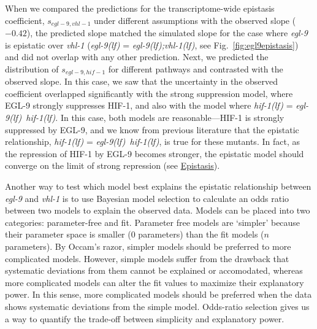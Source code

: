 \documentclass[10pt, onecolumn]{article}
\newcommand{\gene}[1]{\emph{#1}}
\newcommand{\egl}{\emph{\mbox{egl-9}(lf)}}
\newcommand{\eglvhl}{\emph{\mbox{egl-9(lf);vhl-1(lf)}}}
\newcommand{\eglhif}{\emph{\mbox{egl-9(lf)}~\mbox{hif-1(lf)}}}
\newcommand{\hif}{\emph{\mbox{hif-1(lf)}}}
\newcommand{\eglp}{EGL-9}
\newcommand{\hifp}{HIF-1}
\begin{document}
When we compared the predictions for the transcriptome-wide epistasis coefficient,
$s_{egl-9,vhl-1}$ under different assumptions with the observed slope ($-0.42$),
the predicted slope matched the simulated slope for the case where
\gene{egl-9} is epistatic over \gene{vhl-1} (\egl{} = \eglvhl{}, see
Fig.~\ref{fig:egl9epistasis}) and did not overlap with any other prediction.
Next, we predicted the distribution of $s_{egl-9,hif-1}$ for different pathways
and contrasted with the observed slope. In this case, we saw that the uncertainty
in the observed coefficient overlapped significantly with the strong suppression
model, where \eglp{} strongly suppresses \hifp{}, and also with the model where
\hif{} = \eglhif{}. In this case, both models are reasonable---\hifp{} is strongly
suppressed by \eglp{}, and we know from previous literature that the epistatic
relationship, \hif{} = \eglhif{}, is true for these mutants. In fact, as the
repression of \hifp{} by \eglp{} becomes stronger, the epistatic model should
converge on the limit of strong repression (see
\href{https://wormlabcaltech.github.io/mprsq/analysis_notebooks/epistasis_6.html}
{Epistasis}).

Another way to test which model best explains the epistatic relationship between
\gene{egl-9} and \gene{vhl-1} is to use Bayesian model selection to calculate
an odds ratio between two models to explain the observed data. Models can be placed
into two categories: parameter-free and fit. Parameter free models are `simpler'
because their parameter space is smaller (0 parameters) than the fit models ($n$
parameters). By Occam's razor, simpler models should be preferred to more
complicated models. However, simple models suffer from the drawback that
systematic deviations from them cannot be explained or accomodated, whereas more
complicated models can alter the fit values to maximize their explanatory power.
In this sense, more complicated models should be preferred when the data shows
systematic deviations from the simple model. Odds-ratio selection gives us a way
to quantify the trade-off between simplicity and explanatory power.
\end{document}

